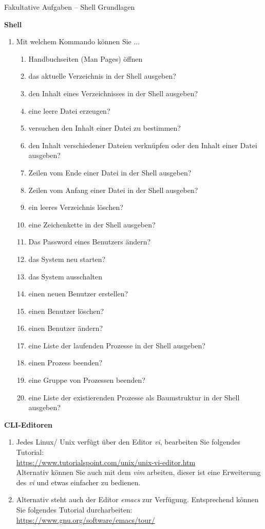 \documentclass[paper=a4,fontsize=11pt]{scrartcl}%
\numberwithin{equation}{section}
\begin{document}
\center
\Large{Fakultative Aufgaben -- Shell Grundlagen}
\begin{center}\Large{\textbf{Shell}}\end{center}\vskip0.25in
\begin{enumerate}
	\item Mit welchem Kommando können Sie ...
   \begin{enumerate}[label=(\alph*)]
   \item Handbuchseiten (Man Pages) öffnen
   \item das aktuelle Verzeichnis in der Shell ausgeben?
   \item den Inhalt eines Verzeichnisses in der Shell ausgeben?
   \item eine leere Datei erzeugen?
   \item versuchen den Inhalt einer Datei zu bestimmen?
   \item den Inhalt verschiedener Dateien verknüpfen oder den Inhalt einer Datei ausgeben?
   \item Zeilen vom Ende einer Datei in der Shell ausgeben?
   \item Zeilen vom Anfang einer Datei in der Shell ausgeben?
   \item ein leeres Verzeichnis löschen?
   \item eine Zeichenkette in der Shell ausgeben?
   \item Das Password eines Benutzers ändern?
   \item das System neu starten?
   \item das System ausschalten
   \item einen neuen Benutzer erstellen?
   \item einen Benutzer löschen?
   \item einen Benutzer ändern?
   \item eine Liste der laufenden Prozesse in der Shell ausgeben?
   \item einen Prozess beenden?
   \item eine Gruppe von Prozessen beenden?
   \item eine Liste der existierenden Prozesse als Baumstruktur in der Shell ausgeben?
	\end{enumerate}
\end{enumerate}
   \begin{center}\Large{\textbf{CLI-Editoren}}\end{center}\vskip0.25in
   \begin{enumerate}
   		\item Jedes Linux/ Unix verfügt über den Editor \emph{vi}, bearbeiten Sie folgendes Tutorial:\\
  \url{https://www.tutorialspoint.com/unix/unix-vi-editor.htm}\\
  Alternativ können Sie auch mit dem \emph{vim} arbeiten, dieser ist eine Erweiterung des \emph{vi} und etwas einfacher zu bedienen.
  		\item Alternativ steht auch der Editor \emph{emacs} zur Verfügung. Entsprechend können Sie folgendes Tutorial durcharbeiten:\\
  		\url{https://www.gnu.org/software/emacs/tour/}
\end{enumerate}
\end{document}
